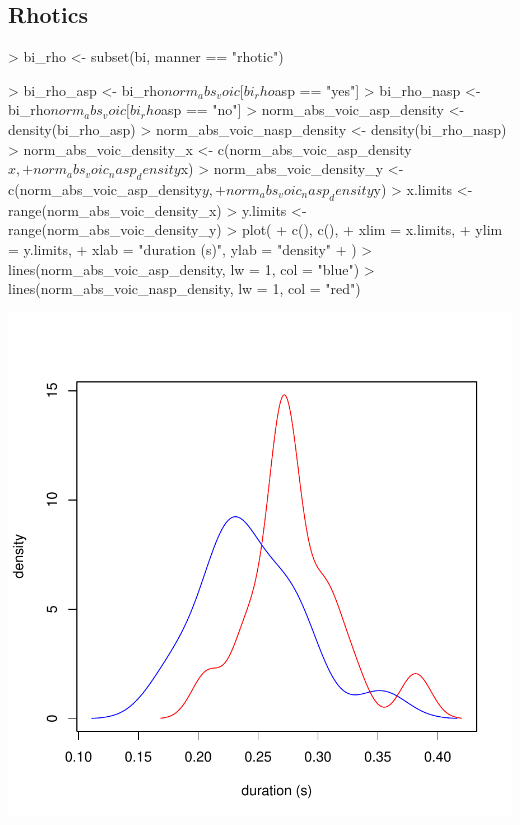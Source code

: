 \documentclass[a4paper,11pt]{article}
\begin{document}
\subsection{Rhotics}

\begin{Schunk}
\begin{Sinput}
> bi_rho <- subset(bi, manner == "rhotic")
\end{Sinput}
\end{Schunk}

\begin{Schunk}
\begin{Sinput}
> bi_rho_asp <- bi_rho$norm_abs_voic[bi_rho$asp == "yes"]
> bi_rho_nasp <- bi_rho$norm_abs_voic[bi_rho$asp == "no"]
> norm_abs_voic_asp_density <- density(bi_rho_asp)
> norm_abs_voic_nasp_density <- density(bi_rho_nasp)
> norm_abs_voic_density_x <- c(norm_abs_voic_asp_density$x, 
+                                   norm_abs_voic_nasp_density$x)
> norm_abs_voic_density_y <- c(norm_abs_voic_asp_density$y, 
+                                   norm_abs_voic_nasp_density$y)
> x.limits <- range(norm_abs_voic_density_x)
> y.limits <- range(norm_abs_voic_density_y)
> plot(
+ c(), c(),
+ xlim = x.limits,
+ ylim = y.limits,
+ xlab = "duration (s)", ylab = "density"
+ )
> lines(norm_abs_voic_asp_density, lw = 1, col = "blue")
> lines(norm_abs_voic_nasp_density, lw = 1, col = "red")
\end{Sinput}
\end{Schunk}
\includegraphics{analysis-032}
\end{document}
